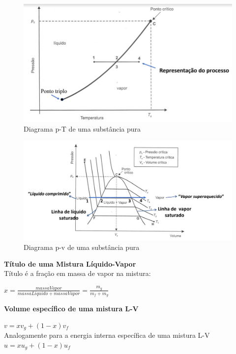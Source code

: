 \documentclass[a4paper, 12pt]{article}
\begin{document}
	\begin{figure}[h]
		\includegraphics[width = 12cm]{pt.png}
		\centering
		\caption{Diagrama p-T de uma substância pura}
	\end{figure}

	\begin{figure}[h]
		\includegraphics[width = 14cm]{pv.png}
		\centering
		\caption{Diagrama p-v de uma substância pura}
	\end{figure}

\textbf{Título de uma Mistura Líquido-Vapor}\\
Título é a fração em massa de vapor na mistura:

	\begin{center}
		\large
		$ x = \frac{massaVapor}{massaLiquido + massaVapor} = \frac{m_{g}}{m_{f} + m_{g}}$
	\end{center}	

\textbf{Volume específico de uma mistura L-V}\\
	\begin{center}
		\large
		$ v = xv_g+(1 - x)v_f $ \\
		Analogamente para a energia interna específica de uma mistura L-V
		$ u = xu_g+(1 - x)u_f $ \\ 
	\end{center}
\end{document}
